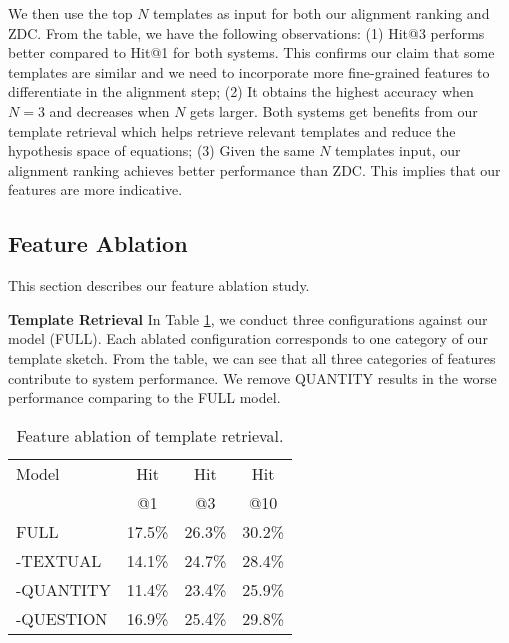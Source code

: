 \documentclass[11pt,letterpaper]{article}
\begin{document}
We then use the top $N$ templates as input for both our alignment ranking and ZDC. From the table, we have the following observations: (1) Hit@3 performs better compared to Hit@1 for both systems. This confirms our claim that some templates are similar and we need to incorporate more fine-grained features to differentiate in the alignment step; (2) It obtains the highest accuracy when $N=3$ and decreases when $N$ gets larger. Both systems get benefits from our template retrieval which helps retrieve relevant templates and reduce the hypothesis space of equations; (3) Given the same $N$ templates input, our alignment ranking achieves better performance than ZDC. This implies that our features are more indicative.

\subsection{Feature Ablation}
This section describes our feature ablation study.

\textbf{Template Retrieval} In Table \ref{tbl:templateablation}, we conduct three configurations against our model (FULL). Each ablated configuration corresponds to one category of our template sketch. From the table, we can see that all three categories of features contribute to system performance. We remove QUANTITY results in the worse performance comparing to the FULL model.
\begin{table}[htb]
\begin{center}
	\begin{tabular}{l|c|c|c}
        \hline
		Model & Hit & Hit & Hit\\
                &  @1   &  @3  & @10\\
        \hline
		FULL & 17.5\% & 26.3\% & 30.2\%\\
        \hline
		-TEXTUAL & 14.1\% & 24.7\% & 28.4\%\\
        \hline
		-QUANTITY & 11.4\% & 23.4\% & 25.9\%\\
        \hline
		-QUESTION & 16.9\% & 25.4\% & 29.8\%\\
		\hline
	\end{tabular}
\end{center}
	\caption{Feature ablation of template retrieval.}\label{tbl:templateablation}
\end{table}
\end{document}
